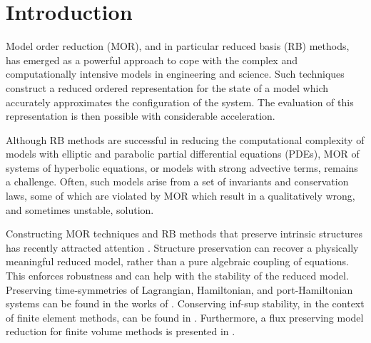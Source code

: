 \section{Introduction} \label{sec:intro}

Model order reduction (MOR), and in particular reduced basis (RB) methods, has emerged as a powerful approach to cope with the complex and computationally intensive models in engineering and science. Such techniques construct a reduced ordered representation for the state of a model which accurately approximates the configuration of the system. The evaluation of this representation is then possible with considerable acceleration.

Although RB methods are successful in reducing the computational complexity of models with elliptic and parabolic partial differential equations (PDEs), MOR of systems of hyperbolic equations, or models with strong advective terms, remains a challenge. Often, such models arise from a set of invariants and conservation laws, some of which are violated by MOR which result in a qualitatively wrong, and sometimes unstable, solution.

Constructing MOR techniques and RB methods that preserve intrinsic structures has recently attracted attention \cite{doi:10.1137/17M1111991,kalashnikova2014stabilization,farhat2015structure,doi:10.1137/110836742,beattie2011structure,doi:10.1137/140978922}. Structure preservation can recover a physically meaningful reduced model, rather than a pure algebraic coupling of equations. This enforces robustness and can help with the stability of the reduced model. Preserving time-symmetries of Lagrangian, Hamiltonian, and port-Hamiltonian systems can be found in the works of \cite{Carlberg:2014ky,doi:10.1137/140978922,doi:10.1137/17M1111991,beattie2011structure,chaturantabut2016structure,gugercin2012structure}. Conserving inf-sup stability, in the context of finite element methods, can be found in \cite{farhat2015structure,ballarin2015supremizer}. Furthermore, a flux preserving model reduction for finite volume methods is presented in \cite{carlberg2018conservative}. 

